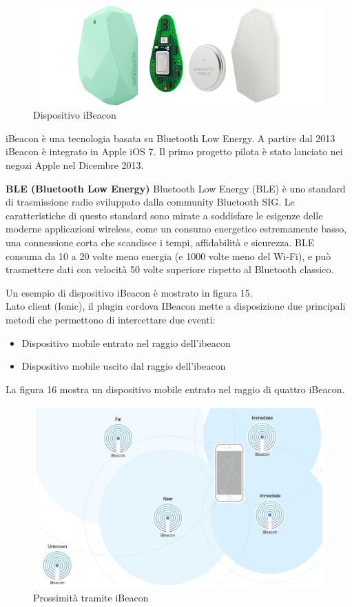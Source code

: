 \begin{figure}[H]
    \centering  
    \caption{Dispositivo iBeacon}
    \includegraphics[scale=0.3]{img/cap2/beacon}
\end{figure}

iBeacon è una tecnologia basata su Bluetooth Low Energy. A partire dal 2013 iBeacon è 
integrato in Apple iOS 7. Il primo progetto pilota è stato lanciato nei negozi Apple nel
Dicembre 2013.

\textbf{BLE (Bluetooth Low Energy)}
Bluetooth Low Energy (BLE) è uno standard di trasmissione radio sviluppato dalla community 
Bluetooth SIG. Le caratteristiche di questo standard sono mirate a soddisfare le esigenze
delle moderne applicazioni wireless, come un consumo energetico estremamente basso, una
connessione corta che scandisce i tempi, affidabilità e sicurezza. 
BLE consuma da 10 a 20 volte meno energia (e 1000 volte meno del Wi-Fi), e può trasmettere
dati con velocità 50 volte superiore rispetto al Bluetooth classico. 

Un esempio di dispositivo iBeacon è mostrato in figura 15.\\
Lato client (Ionic), il plugin cordova IBeacon mette a disposizione due principali metodi
che permettono di intercettare due eventi:

\begin{itemize}
    \item Dispositivo mobile entrato nel raggio dell'ibeacon
    \item Dispositivo mobile uscito dal raggio dell'ibeacon
\end{itemize}

La figura 16 mostra un dispositivo mobile entrato nel raggio di quattro iBeacon.
\begin{figure}[H]
    \centering  
    \caption{Prossimità tramite iBeacon}
    \includegraphics[scale=0.3]{img/cap2/beacon-proximity}
\end{figure}


